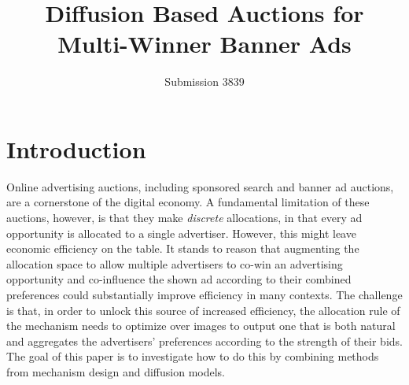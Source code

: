 \documentclass[format=acmsmall, review=false]{acmart}
\title[Diffusion Based Auctions for Banner Ads]{Diffusion Based Auctions for Multi-Winner Banner Ads}
\author{Submission 3839}
\begin{document}
\begin{titlepage}

\maketitle

\vspace{1cm}
\setcounter{tocdepth}{1} %
\tableofcontents

\end{titlepage}



\section{Introduction}

Online advertising auctions, including sponsored search and banner ad auctions, are a cornerstone of the digital economy. A fundamental limitation of these auctions, however, is that they make \emph{discrete} allocations, in that every  ad opportunity is allocated to a single advertiser. However, this might leave economic efficiency on the table. It stands to reason that augmenting the allocation space to allow multiple advertisers to co-win an advertising opportunity and co-influence the shown ad according to their combined preferences could substantially improve efficiency in many contexts. The challenge is that, in order to unlock this source of increased efficiency, the allocation rule of the mechanism needs to optimize over images to output one that is both natural and aggregates the advertisers' preferences according to the strength of their bids. The goal of this paper is to investigate how to do this by combining methods from mechanism design and diffusion models. 






\end{document}
